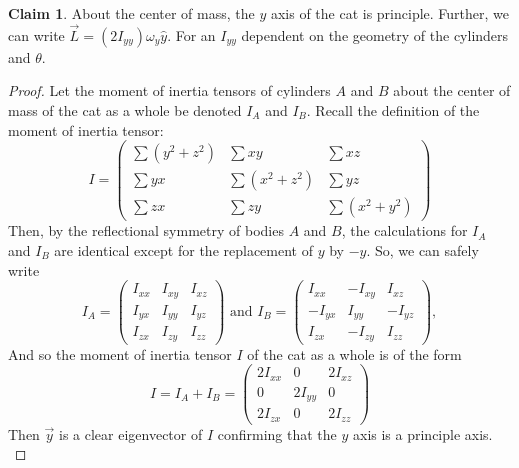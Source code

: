 \documentclass[12]{amsart}
\theoremstyle{definition}
\newtheorem{claim}[theorem]{Claim}
\begin{document}
\begin{claim}
  About the center of mass, the $y$ axis of the cat is principle. Further, we can write $\vec{L} = (2I_{yy})\omega_y\hat{y}$. For an $I_{yy}$ dependent on the geometry of the cylinders and $\theta$.
\end{claim}
\begin{proof}
  Let the moment of inertia tensors of cylinders $A$ and $B$ about the center of mass of the cat as a whole be denoted $I_A$ and $I_B$. Recall the definition of the moment of inertia tensor:
  \begin{equation*}
    I =
    \begin{pmatrix}
      \sum(y^2+z^2) & \sum xy       & \sum xz     \\
      \sum yx      & \sum(x^2+z^2) & \sum yz      \\
      \sum zx      & \sum zy       & \sum(x^2+y^2)
    \end{pmatrix}
  \end{equation*}
  Then, by the reflectional symmetry of bodies $A$ and $B$, the calculations for $I_A$ and $I_B$ are identical except for the replacement of $y$ by $-y$. So, we can safely write
  \begin{equation*}
    I_A =
    \begin{pmatrix}
      I_{xx} & I_{xy} & I_{xz} \\
      I_{yx} & I_{yy} & I_{yz} \\
      I_{zx} & I_{zy} & I_{zz}
    \end{pmatrix} \text{ and }
    I_B =
    \begin{pmatrix}
      I_{xx} & -I_{xy} & I_{xz} \\
      -I_{yx} & I_{yy} & -I_{yz} \\
      I_{zx} & -I_{zy} & I_{zz}
    \end{pmatrix},
  \end{equation*}
  And so the moment of inertia tensor $I$ of the cat as a whole is of the form
  \begin{equation*}
    I = I_A + I_B =
    \begin{pmatrix}
      2I_{xx} & 0       & 2I_{xz} \\
      0       & 2I_{yy} & 0 \\
      2I_{zx} & 0       & 2I_{zz}
    \end{pmatrix}
  \end{equation*}
  Then $\vec{y}$ is a clear eigenvector of $I$ confirming that the $y$ axis is a principle axis.
  \label{claim:principle}
\end{proof}
\end{document}
